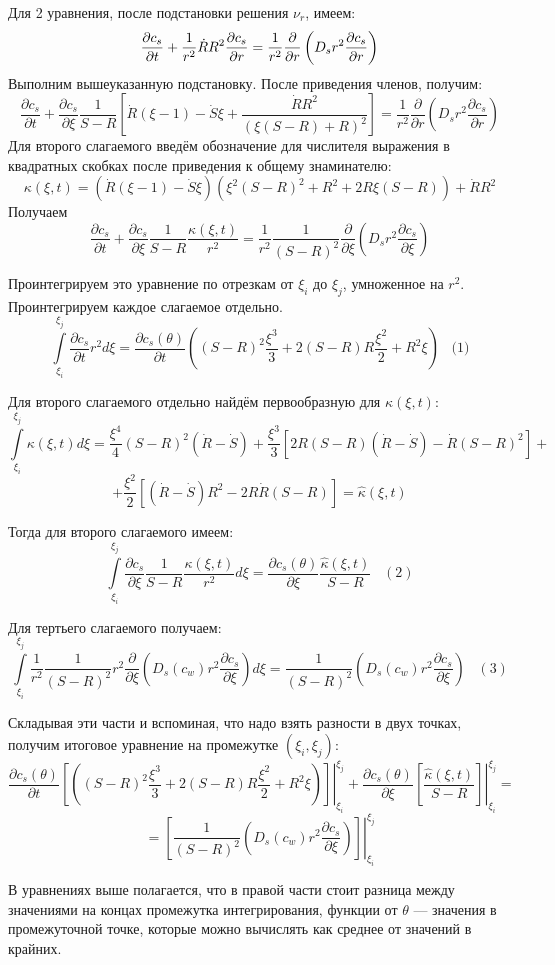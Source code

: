 \par Для 2 уравнения, после подстановки решения $\nu_{r}$, имеем:\\
$$\displaystyle \frac{\partial c_{s}}{\partial t}+\frac{1}{r^{2}}\dot{R}R^{2}\frac{\partial c_{s}}{\partial r}=\frac{1}{r^{2}}\frac{\partial}{\partial r}\left(D_{s}r^{2}\frac{\partial c_{s}}{\partial r}\right)$$
Выполним вышеуказанную подстановку. После приведения членов, получим:
$$\frac{\partial c_{s}}{\partial t}+\frac{\partial c_{s}}{\partial \xi}\frac{1}{S-R}\left[\dot{R}(\xi-1)-\dot{S}\xi+\frac{\dot{R}R^{2}}{(\xi(S-R)+R)^{2}}\right]=\frac{1}{r^{2}}\frac{\partial}{\partial r}\left(D_{s}r^{2}\frac{\partial c_{s}}{\partial r}\right)$$
Для второго слагаемого введём обозначение для числителя выражения в квадратных скобках после приведения к общему знаминателю:
$$\kappa(\xi,t)=\left(\dot{R}(\xi-1)-\dot{S}\xi\right)\left(\xi^{2}(S-R)^{2}+R^{2}+2R\xi(S-R)\right)+\dot{R}R^{2}$$
Получаем
$$\frac{\partial c_{s}}{\partial t}+\frac{\partial c_{s}}{\partial \xi}\frac{1}{S-R}\frac{\kappa(\xi,t)}{r^{2}}=\frac{1}{r^{2}}\frac{1}{(S-R)^{2}}\frac{\partial}{\partial \xi}\left(D_{s}r^{2}\frac{\partial c_{s}}{\partial \xi}\right)$$
\par Проинтегрируем это уравнение по отрезкам от $\xi_{i}$ до $\xi_{j}$, умноженное на $r^{2}$. Проинтегрируем каждое слагаемое отдельно.
$$\int\limits^{\xi_{j}}_{\xi_{i}}\frac{\partial c_{s}}{\partial t}r^{2}d\xi=\frac{\partial c_{s}(\theta)}{\partial t}\left(\left(S-R\right)^{2}\frac{\xi^{3}}{3}+2\left(S-R\right)R\frac{\xi^{2}}{2}+R^{2}\xi\right)\;\;\;\text{(1)}$$
\par Для второго слагаемого отдельно найдём первообразную для $\kappa(\xi,t)$:\\
$$\int\limits^{\xi_{j}}_{\xi_{i}}\kappa(\xi,t)d\xi = \frac{\xi^{4}}{4}(S-R)^{2}(\dot{R}-\dot{S})+\frac{\xi^{3}}{3}[2R(S-R)(\dot{R}-\dot{S})-\dot{R}(S-R)^{2}]+$$
$$+\frac{\xi^{2}}{2}[(\dot{R}-\dot{S})R^{2}-2R\dot{R}(S-R)]=\hat{\kappa}(\xi,t)$$
\par Тогда для второго слагаемого имеем:\\
$$\int\limits^{\xi_{j}}_{\xi_{i}}\frac{\partial c_{s}}{\partial \xi}\frac{1}{S-R}\frac{\kappa(\xi,t)}{r^{2}}d\xi=\frac{\partial c_{s}(\theta)}{\partial \xi}\frac{\hat{\kappa}(\xi,t)}{S-R}\;\;\;(2)$$
\par Для тертьего слагаемого получаем:
$$\int\limits^{\xi_{j}}_{\xi_{i}}\frac{1}{r^{2}}\frac{1}{(S-R)^{2}}r^{2}\frac{\partial}{\partial \xi}\left(D_{s}(c_{w})r^{2}\frac{\partial c_{s}}{\partial \xi}\right)d\xi=\frac{1}{(S-R)^{2}}\left(D_{s}(c_{w})r^{2}\frac{\partial c_{s}}{\partial \xi}\right)\;\;\;(3)$$
\par Складывая эти части и вспоминая, что надо взять разности в двух точках, получим итоговое уравнение на промежутке $(\xi_{i},\xi_{j})$: 
$$\frac{\partial c_{s}(\theta)}{\partial t}\left.\left[\left(\left(S-R\right)^{2}\frac{\xi^{3}}{3}+2\left(S-R\right)R\frac{\xi^{2}}{2}+R^{2}\xi\right)\right]\right|_{\xi_{i}}^{\xi_{j}}+\frac{\partial c_{s}(\theta)}{\partial \xi}\left.\left[\frac{\hat{\kappa}(\xi,t)}{S-R}\right]\right|_{\xi_{i}}^{\xi_{j}}=$$
$$=\left.\left[\frac{1}{(S-R)^{2}}\left(D_{s}(c_{w})r^{2}\frac{\partial c_{s}}{\partial \xi}\right)\right]\right|_{\xi_{i}}^{\xi_{j}}$$


\par В уравнениях выше полагается, что в правой части стоит разница между значениями на концах промежутка интегрирования, функции от $\theta$ --- значения в промежуточной точке, которые можно вычислять как среднее от значений в крайних.